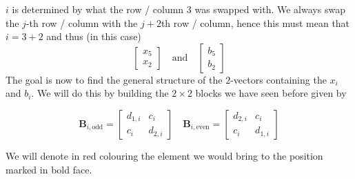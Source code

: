 \documentclass{article}
\begin{document}
$i$ is determined by what the row / column $3$ was swapped with. We always swap the $j$-th row / column with the $j + 2$th row / column, hence this must mean that $i = 3 + 2$ and thus (in this case)
\begin{equation*}
    \begin{bmatrix}
        x_{5} \\ x_{2}
    \end{bmatrix} \quad \text{and} \quad \begin{bmatrix}
        b_{5} \\ b_{2}
    \end{bmatrix}
\end{equation*}
The goal is now to find the general structure of the $2$-vectors containing the $x_{i}$ and $b_{i}$. We will do this by building the $2 \times 2$ blocks we have seen before given by

\begin{equation*}
    \mathbf{B}_{i, \text{odd}} = \begin{bmatrix}
        d_{1, i} & c_{i} \\
        c_{i} & d_{2,i}
    \end{bmatrix} \quad
    \mathbf{B}_{i, \text{even}} = \begin{bmatrix}
        d_{2, i} & c_{i} \\
        c_{i} & d_{1,i}
    \end{bmatrix}
\end{equation*}

\pagebreak

We will denote in red colouring the element we would bring to the position marked in bold face. 
\end{document}
